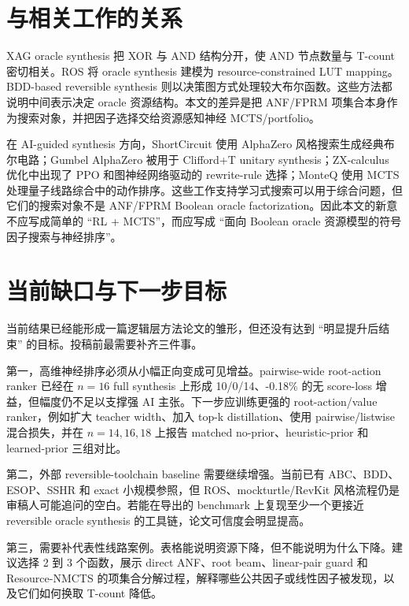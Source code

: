 \documentclass[UTF8,fontset=macnew,11pt]{ctexart}
\newcommand{\method}{Resource-NMCTS}
\begin{document}
\section{与相关工作的关系}

XAG oracle synthesis 把 XOR 与 AND 结构分开，使 AND 节点数量与 T-count 密切相关\cite{meuli2022xag,meuli2019multiplicative}。ROS 将 oracle synthesis 建模为 resource-constrained LUT mapping\cite{meuli2020ros}。BDD-based reversible synthesis 则以决策图方式处理较大布尔函数\cite{wille2009bdd}。这些方法都说明中间表示决定 oracle 资源结构。本文的差异是把 ANF/FPRM 项集合本身作为搜索对象，并把因子选择交给资源感知神经 MCTS/portfolio。

在 AI-guided synthesis 方向，ShortCircuit 使用 AlphaZero 风格搜索生成经典布尔电路\cite{tsaras2024shortcircuit}；Gumbel AlphaZero 被用于 Clifford+T unitary synthesis\cite{rietsch2024unitary}；ZX-calculus 优化中出现了 PPO 和图神经网络驱动的 rewrite-rule 选择\cite{riu2025zx}；MonteQ 使用 MCTS 处理量子线路综合中的动作排序\cite{machiya2026monteq}。这些工作支持学习式搜索可以用于综合问题，但它们的搜索对象不是 ANF/FPRM Boolean oracle factorization。因此本文的新意不应写成简单的 ``RL + MCTS''，而应写成 ``面向 Boolean oracle 资源模型的符号因子搜索与神经排序''。

\section{当前缺口与下一步目标}

当前结果已经能形成一篇逻辑层方法论文的雏形，但还没有达到 ``明显提升后结束'' 的目标。投稿前最需要补齐三件事。

第一，高维神经排序必须从小幅正向变成可见增益。pairwise-wide root-action ranker 已经在 $n=16$ full synthesis 上形成 10/0/14、-0.18\% 的无 score-loss 增益，但幅度仍不足以支撑强 AI 主张。下一步应训练更强的 root-action/value ranker，例如扩大 teacher width、加入 top-k distillation、使用 pairwise/listwise 混合损失，并在 $n=14,16,18$ 上报告 matched no-prior、heuristic-prior 和 learned-prior 三组对比。

第二，外部 reversible-toolchain baseline 需要继续增强。当前已有 ABC、BDD、ESOP、SSHR 和 exact 小规模参照，但 ROS、mockturtle/RevKit 风格流程仍是审稿人可能追问的空白。若能在导出的 benchmark 上复现至少一个更接近 reversible oracle synthesis 的工具链，论文可信度会明显提高。

第三，需要补代表性线路案例。表格能说明资源下降，但不能说明为什么下降。建议选择 2 到 3 个函数，展示 direct ANF、root beam、linear-pair guard 和 \method{} 的项集合分解过程，解释哪些公共因子或线性因子被发现，以及它们如何换取 T-count 降低。
\end{document}
